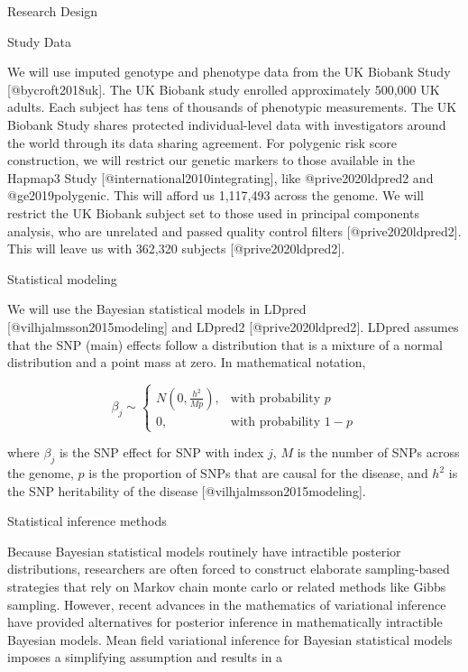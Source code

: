 \documentclass[
  letterpaper,
  DIV=11,
  numbers=noendperiod]{scrartcl}
\begin{document}
Research Design

Study Data

We will use imputed genotype and phenotype data from the UK Biobank
Study {[}@bycroft2018uk{]}. The UK Biobank study enrolled approximately
500,000 UK adults. Each subject has tens of thousands of phenotypic
measurements. The UK Biobank Study shares protected individual-level
data with investigators around the world through its data sharing
agreement. For polygenic risk score construction, we will restrict our
genetic markers to those available in the Hapmap3 Study
{[}@international2010integrating{]}, like @prive2020ldpred2 and
@ge2019polygenic. This will afford us 1,117,493 across the genome. We
will restrict the UK Biobank subject set to those used in principal
components analysis, who are unrelated and passed quality control
filters {[}@prive2020ldpred2{]}. This will leave us with 362,320
subjects {[}@prive2020ldpred2{]}.

Statistical modeling

We will use the Bayesian statistical models in LDpred
{[}@vilhjalmsson2015modeling{]} and LDpred2 {[}@prive2020ldpred2{]}.
LDpred assumes that the SNP (main) effects follow a distribution that is
a mixture of a normal distribution and a point mass at zero. In
mathematical notation,

\[\begin{equation}
\beta_j \sim    
    \begin{cases}
        N(0, \frac{h^2}{Mp}), & \text{with probability } p \\
        0, & \text{with probability } 1-p
    \end{cases}
\end{equation}
\]

where \(\beta_j\) is the SNP effect for SNP with index \(j\), \(M\) is
the number of SNPs across the genome, \(p\) is the proportion of SNPs
that are causal for the disease, and \(h^2\) is the SNP heritability of
the disease {[}@vilhjalmsson2015modeling{]}.

Statistical inference methods

Because Bayesian statistical models routinely have intractible posterior
distributions, researchers are often forced to construct elaborate
sampling-based strategies that rely on Markov chain monte carlo or
related methods like Gibbs sampling. However, recent advances in the
mathematics of variational inference have provided alternatives for
posterior inference in mathematically intractible Bayesian models. Mean
field variational inference for Bayesian statistical models imposes a
simplifying assumption and results in a
\end{document}
